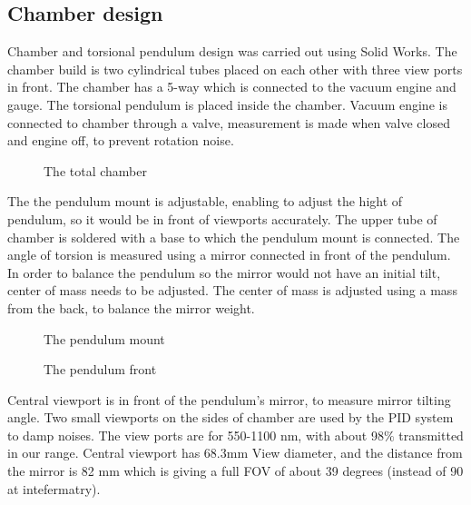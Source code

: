 \documentclass[\main/master.tex]{subfiles}
\begin{document}
\subsection{Chamber design}

Chamber and torsional pendulum design was carried out using Solid Works. The chamber build is two cylindrical tubes placed on each other with three view ports in front. The chamber has a 5-way which is connected to the vacuum engine and gauge. The torsional pendulum is placed inside the chamber. Vacuum engine is connected to chamber through a valve, measurement is made when valve closed and engine off, to prevent rotation noise.

\begin{figure}[htbp]
	\centering
	\caption[total chamber]{The total chamber}
	\label{fig:total}
\end{figure}

\noindent
The the pendulum mount is adjustable, enabling to adjust the hight of pendulum, so it would be in front of viewports accurately. The upper tube of chamber is soldered with a base to which the pendulum mount is connected. The angle of torsion is measured using a mirror connected in front of the pendulum. In order to balance the pendulum so the mirror would not have an initial tilt, center of mass needs to be adjusted. The center of mass is adjusted using a mass from the back, to balance the mirror weight.

\begin{figure}[htbp]
	\centering
	\caption[Pendulum mount]{The pendulum mount}
	\label{fig:mount}
\end{figure}



\begin{figure}[htbp]
	\centering
	\caption[Pendulum front]{The pendulum front}
	\label{fig:pendulum front}
\end{figure}

\noindent
Central viewport is in front of the pendulum's mirror, to measure mirror tilting angle. Two small viewports on the sides of chamber are used by the PID system to damp noises. The view ports are for 550-1100 nm, with about 98$\%$ transmitted in our range. Central viewport has 68.3mm View diameter, and the distance from the mirror is 82 mm which is giving a full FOV of about 39 degrees (instead of 90 at intefermatry).
\end{document}
